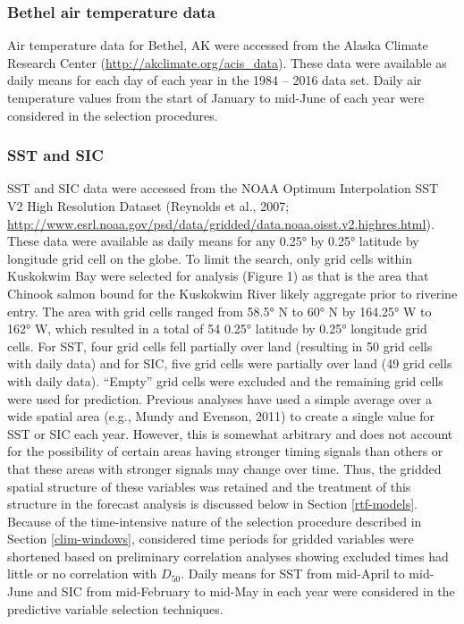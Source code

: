 \documentclass[12pt,]{book}
\theoremstyle{definition}
\theoremstyle{definition}
\theoremstyle{definition}
\theoremstyle{remark}
\begin{document}
\subsubsection{Bethel air temperature
data}\label{bethel-air-temperature-data}

Air temperature data for Bethel, AK were accessed from the Alaska
Climate Research Center (\url{http://akclimate.org/acis_data}). These
data were available as daily means for each day of each year in the 1984
-- 2016 data set. Daily air temperature values from the start of January
to mid-June of each year were considered in the selection procedures.

\subsubsection{SST and SIC}\label{sst-and-sic}

SST and SIC data were accessed from the NOAA Optimum Interpolation SST
V2 High Resolution Dataset (Reynolds et al., 2007;
\url{http://www.esrl.noaa.gov/psd/data/gridded/data.noaa.oisst.v2.highres.html}).
These data were available as daily means for any 0.25° by 0.25° latitude
by longitude grid cell on the globe. To limit the search, only grid
cells within Kuskokwim Bay were selected for analysis (Figure 1) as that
is the area that Chinook salmon bound for the Kuskokwim River likely
aggregate prior to riverine entry. The area with grid cells ranged from
58.5° N to 60° N by 164.25° W to 162° W, which resulted in a total of 54
0.25° latitude by 0.25° longitude grid cells. For SST, four grid cells
fell partially over land (resulting in 50 grid cells with daily data)
and for SIC, five grid cells were partially over land (49 grid cells
with daily data). ``Empty'' grid cells were excluded and the remaining
grid cells were used for prediction. Previous analyses have used a
simple average over a wide spatial area (e.g., Mundy and Evenson, 2011)
to create a single value for SST or SIC each year. However, this is
somewhat arbitrary and does not account for the possibility of certain
areas having stronger timing signals than others or that these areas
with stronger signals may change over time. Thus, the gridded spatial
structure of these variables was retained and the treatment of this
structure in the forecast analysis is discussed below in Section
\ref{rtf-models}. Because of the time-intensive nature of the selection
procedure described in Section \ref{clim-windows}, considered time
periods for gridded variables were shortened based on preliminary
correlation analyses showing excluded times had little or no correlation
with \(D_{50}\). Daily means for SST from mid-April to mid-June and SIC
from mid-February to mid-May in each year were considered in the
predictive variable selection techniques.
\end{document}
